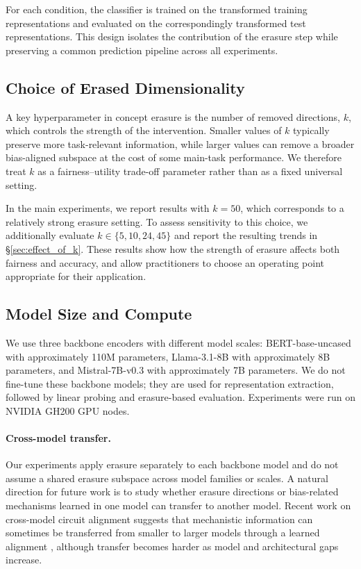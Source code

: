 \documentclass[11pt]{article}
\begin{document}
For each condition, the classifier is trained on the transformed training representations and evaluated on the correspondingly transformed test representations. This design isolates the contribution of the erasure step while preserving a common prediction pipeline across all experiments.

\subsection{Choice of Erased Dimensionality}
\label{app:k-details}

A key hyperparameter in concept erasure is the number of removed directions, $k$, which controls the strength of the intervention. Smaller values of $k$ typically preserve more task-relevant information, while larger values can remove a broader bias-aligned subspace at the cost of some main-task performance. We therefore treat $k$ as a fairness--utility trade-off parameter rather than as a fixed universal setting.

In the main experiments, we report results with $k=50$, which corresponds to a relatively strong erasure setting. To assess sensitivity to this choice, we additionally evaluate $k \in \{5, 10,24,45\}$ and report the resulting trends in \S\ref{sec:effect_of_k}. These results show how the strength of erasure affects both fairness and accuracy, and allow practitioners to choose an operating point appropriate for their application.

\subsection{Model Size and Compute}
\label{app:model-size-compute}

We use three backbone encoders with different model scales: BERT-base-uncased with approximately 110M parameters, Llama-3.1-8B with approximately 8B parameters, and Mistral-7B-v0.3 with approximately 7B parameters. We do not fine-tune these backbone models; they are used for representation extraction, followed by linear probing and erasure-based evaluation. Experiments were run on NVIDIA GH200 GPU nodes.

\paragraph{Cross-model transfer.}
Our experiments apply erasure separately to each backbone model and do not assume a shared erasure subspace across model families or scales. A natural direction for future work is to study whether erasure directions or bias-related mechanisms learned in one model can transfer to another model. Recent work on cross-model circuit alignment suggests that mechanistic information can sometimes be transferred from smaller to larger models through a learned alignment \citep{shao2026dfa}, although transfer becomes harder as model and architectural gaps increase.
\end{document}
